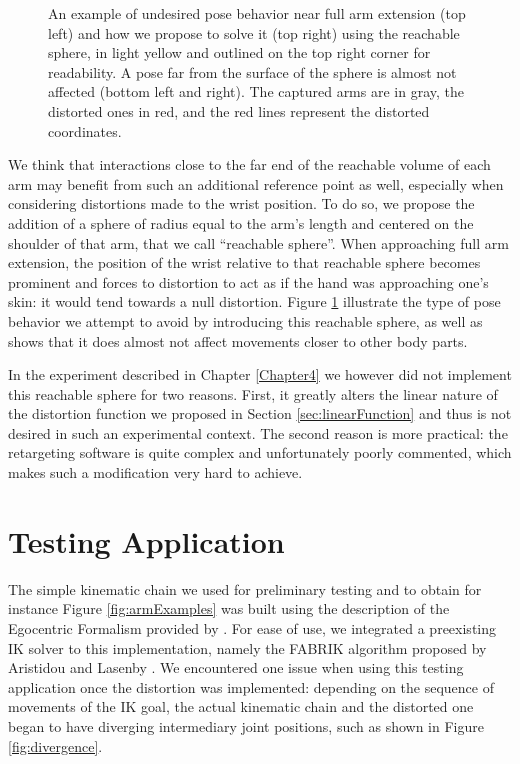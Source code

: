 \begin{figure}[h]
    \caption{An example of undesired pose behavior near full arm extension (top left) and how we propose to solve it (top right) using the reachable sphere, in light yellow and outlined on the top right corner for readability. A pose far from the surface of the sphere is almost not affected (bottom left and right). The captured arms are in gray, the distorted ones in red, and the red lines represent the distorted coordinates.}
    \label{fig:reachableSphere}
\end{figure}

We think that interactions close to the far end of the reachable volume of each arm may benefit from such an additional reference point as well, especially when considering distortions made to the wrist position. To do so, we propose the addition of a sphere of radius equal to the arm's length and centered on the shoulder of that arm, that we call ``reachable sphere''. When approaching full arm extension, the position of the wrist relative to that reachable sphere becomes prominent and forces to distortion to act as if the hand was approaching one's skin: it would tend towards a null distortion. Figure \ref{fig:reachableSphere} illustrate the type of pose behavior we attempt to avoid by introducing this reachable sphere, as well as shows that it does almost not affect movements closer to other body parts.

In the experiment described in Chapter \ref{Chapter4} we however did not implement this reachable sphere for two reasons. First, it greatly alters the linear nature of the distortion function we proposed in Section \ref{sec:linearFunction} and thus is not desired in such an experimental context. The second reason is more practical: the retargeting software is quite complex and unfortunately poorly commented, which makes such a modification very hard to achieve.

\section{Testing Application}
\label{sec:testingApp}
The simple kinematic chain we used for preliminary testing and to obtain for instance Figure \ref{fig:armExamples} was built using the description of the Egocentric Formalism provided by \cite{molla2016precise}. For ease of use, we integrated a preexisting IK solver to this implementation, namely the FABRIK algorithm proposed by Aristidou and Lasenby \cite{aristidou2011fabrik}. We encountered one issue when using this testing application once the distortion was implemented: depending on the sequence of movements of the IK goal, the actual kinematic chain and the distorted one began to have diverging intermediary joint positions, such as shown in Figure \ref{fig:divergence}.

